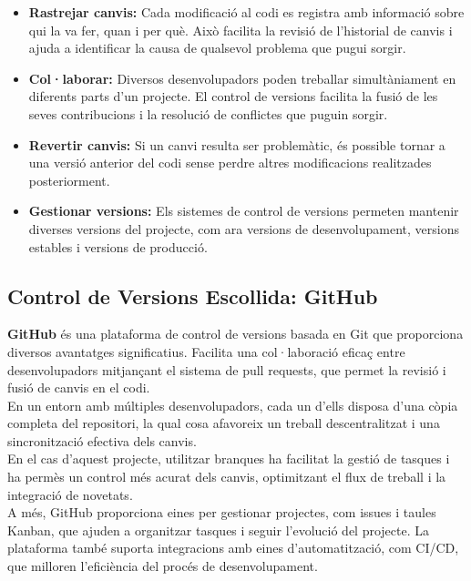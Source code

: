 \documentclass[a4paper,12pt,twoside]{ThesisStyle}
\begin{document}
\begin{itemize}
    \item \textbf{Rastrejar canvis:} Cada modificació al codi es registra amb informació sobre qui la va fer, quan i per què. Això facilita la revisió de l'historial de canvis i ajuda a identificar la causa de qualsevol problema que pugui sorgir.
    \item \textbf{Col·laborar:} Diversos desenvolupadors poden treballar simultàniament en diferents parts d'un projecte. El control de versions facilita la fusió de les seves contribucions i la resolució de conflictes que puguin sorgir.
    \item \textbf{Revertir canvis:} Si un canvi resulta ser problemàtic, és possible tornar a una versió anterior del codi sense perdre altres modificacions realitzades posteriorment.
    \item \textbf{Gestionar versions:} Els sistemes de control de versions permeten mantenir diverses versions del projecte, com ara versions de desenvolupament, versions estables i versions de producció.
\end{itemize}

\subsection{Control de Versions Escollida: GitHub}
\label{subsec: Control de Versions Escollida: GitHub}

\textbf{GitHub} és una plataforma de control de versions basada en Git que proporciona diversos avantatges significatius. Facilita una col·laboració eficaç entre desenvolupadors mitjançant el sistema de pull requests, que permet la revisió i fusió de canvis en el codi.\\

En un entorn amb múltiples desenvolupadors, cada un d'ells disposa d'una còpia completa del repositori, la qual cosa afavoreix un treball descentralitzat i una sincronització efectiva dels canvis.\\

En el cas d'aquest projecte, utilitzar branques ha facilitat la gestió de tasques i ha permès un control més acurat dels canvis, optimitzant el flux de treball i la integració de novetats.\\

A més, GitHub proporciona eines per gestionar projectes, com issues i taules Kanban, que ajuden a organitzar tasques i seguir l'evolució del projecte. La plataforma també suporta integracions amb eines d'automatització, com CI/CD, que milloren l'eficiència del procés de desenvolupament.\\
\end{document}
